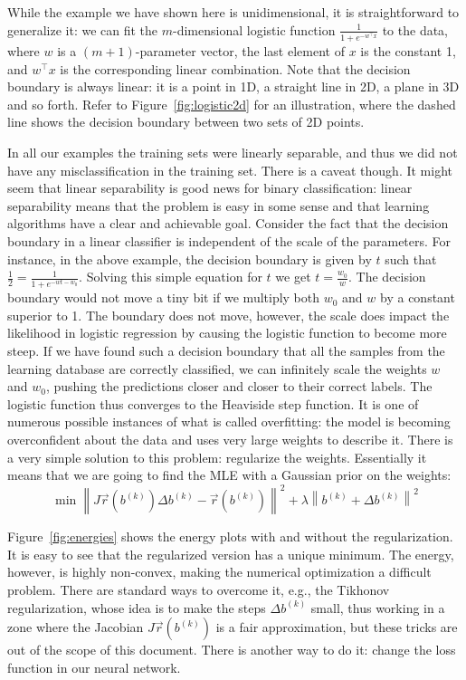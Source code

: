 \documentclass[notitlepage,oneside]{book}
\begin{document}
While the example we have shown here is unidimensional, it is straightforward to generalize it: we can fit the $m$-dimensional logistic function
$\frac{1}{1+e^{-w^\top x}}$ to the data, where $w$ is a $(m+1)$-parameter vector, the last element of $x$ is the constant 1, and $w^\top x$ is the corresponding linear combination.
Note that the decision boundary is always linear: it is a point in 1D, a straight line in 2D, a plane in 3D and so forth.
Refer to Figure~\ref{fig:logistic2d} for an illustration, where the dashed line shows the decision boundary between two sets of 2D points.

In all our examples the training sets were linearly separable, and thus we did not have any misclassification in the training set.
There is a caveat though. It might seem that linear separability is good news for binary classification:
linear separability means that the problem is easy in some sense and that learning algorithms have a clear and achievable goal.
Consider the fact that the decision boundary in a linear classifier is independent of the scale of the parameters.
For instance, in the above example, the decision boundary is given by $t$ such that $\frac{1}{2} = \frac{1}{1+e^{-wt - w_0}}$.
Solving this simple equation for $t$ we get $t=\frac{w_0}{w}$.
The decision boundary would not move a tiny bit if we multiply both $w_0$ and $w$ by a constant superior to 1.
The boundary does not move, however, the scale does impact the likelihood in logistic regression by causing the logistic function to become more steep.
If we have found such a decision boundary that all the samples from the learning database are correctly classified,
we can infinitely scale the weights $w$ and $w_0$, pushing the predictions closer and closer to their correct labels.
The logistic function thus converges to the Heaviside step function.
It is one of numerous possible instances of what is called overfitting:
the model is becoming overconfident about the data and uses very large weights to describe it.
There is a very simple solution to this problem: regularize the weights.
Essentially it means that we are going to find the MLE with a Gaussian prior on the weights:
$$
\min \left\| J\vec{r}\left(b^{(k)}\right) \Delta b^{(k)} - \vec{r}\left(b^{(k)}\right) \right\|^2 + \lambda \left\|b^{(k)} + \Delta b^{(k)}\right\|^2
$$

Figure~\ref{fig:energies} shows the energy plots with and without the regularization. It is easy to see that the regularized version has a unique minimum.
The energy, however, is highly non-convex, making the numerical optimization a difficult problem.
There are standard ways to overcome it, e.g., the Tikhonov regularization, whose idea is to make the steps $\Delta b^{(k)} $ small, thus working 
in a zone where the Jacobian $J\vec{r}\left(b^{(k)}\right)$ is a fair approximation, but these tricks are out of the scope of this document.
There is another way to do it: change the loss function in our neural network.
\end{document}
